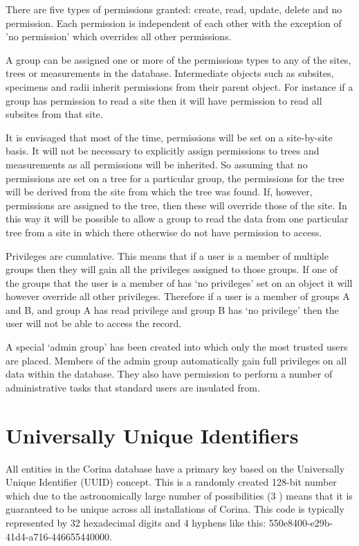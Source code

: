 There are five types of permissions granted: create, read, update, delete and no permission. Each permission is independent of each other with the exception of 'no permission' which overrides all other permissions.

A group can be assigned one or more of the permissions types to any of the sites, trees or measurements in the database. Intermediate objects such as subsites, specimens and radii inherit permissions from their parent object. For instance if a group has permission to read a site then it will have permission to read all subsites from that site.

It is envisaged that most of the time, permissions will be set on a site-by-site basis. It will not be necessary to explicitly assign permissions to trees and measurements as all permissions will be inherited. So assuming that no permissions are set on a tree for a particular group, the permissions for the tree will be derived from the site from which the tree was found. If, however, permissions are assigned to the tree, then these will override those of the site. In this way it will be possible to allow a group to read the data from one particular tree from a site in which there otherwise do not have permission to access.

Privileges are cumulative. This means that if a user is a member of multiple groups then they will gain all the privileges assigned to those groups. If one of the groups that the user is a member of has `no privileges' set on an object it will however override all other privileges. Therefore if a user is a member of groups A and B, and group A has read privilege and group B has `no privilege' then the user will not be able to access the record.

A special `admin group' has been created into which only the most trusted users are placed. Members of the admin group automatically gain full privileges on all data within the database. They also have permission to perform a number of administrative tasks that standard users are insulated from. 


\section{Universally Unique Identifiers}
\label{txt:uuid}
All entities in the Corina database have a primary key based on the Universally Unique Identifier (UUID) concept. This is a randomly created 128-bit number which due to the astronomically large number of possibilities (3 ) means that it is guaranteed to be unique across all installations of Corina. This code is typically represented by 32 hexadecimal digits and 4 hyphens like this: 550e8400-e29b-41d4-a716-446655440000.

